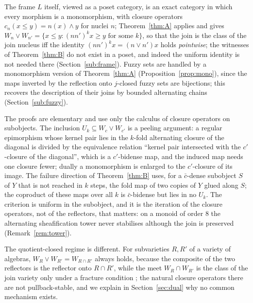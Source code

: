 \documentclass[11pt]{amsart}
\theoremstyle{definition}
\begin{document}
The frame $L$ itself, viewed as a poset category, is an exact category in
which every morphism is a monomorphism, with closure operators
$c_n(x\le y)=n(x)\wedge y$ for nuclei $n$; Theorem~\ref{thm:A} applies and
gives $W_n\vee W_{n'}=\{x\le y:(nn')^kx\ge y\text{ for some }k\}$, so that the
join is the class of the join nucleus iff the identity $(nn')^kx=(n\vee n')x$
holds \emph{pointwise}; the witnesses of Theorem~\ref{thm:B} do not exist in
a poset, and indeed the uniform identity is not needed there
(Section~\ref{sub:frame}). Fuzzy sets are handled by a monomorphism version
of Theorem~\ref{thm:A} (Proposition~\ref{prop:mono}), since the maps
inverted by the reflection onto $j$-closed fuzzy sets are bijections; this
recovers the description of their joins by bounded alternating chains
\cite{Fuzzysame} (Section~\ref{sub:fuzzy}).

The proofs are elementary and use only the calculus of closure operators on
subobjects. The inclusion $U_k\subseteq W_c\vee W_{c'}$ is a peeling argument:
a regular epimorphism whose kernel pair lies in the $k$-fold alternating
closure of the diagonal is divided by the equivalence relation ``kernel pair
intersected with the $c'$-closure of the diagonal'', which is a
$c'$-bidense map, and the induced map needs one closure fewer; dually a
monomorphism is enlarged to the $c'$-closure of its image. The failure
direction of Theorem~\ref{thm:B} uses, for a $\bar c$-dense subobject $S$
of $Y$ that is not reached in $k$ steps, the fold map of two copies of $Y$
glued along $S$; the coproduct of these maps over all $k$ is $\bar c$-bidense
but lies in no $U_k$. The criterion is uniform in the subobject, and it is
the iteration of the closure operators, not of the reflectors, that
matters: on a monoid of order $8$ the alternating sheafification tower
never stabilises although the join is preserved
(Remark~\ref{rem:tower}).

The quotient-closed regime is different. For subvarieties $R,R'$ of a
variety of algebras, $W_R\vee W_{R'}=W_{R\cap R'}$ always holds, because the
composite of the two reflectors is the reflector onto $R\cap R'$, while the
meet $W_R\cap W_{R'}$ is the class of the join variety only under a fracture
condition \cite{Varieties}; the natural closure operators there are not
pullback-stable, and we explain in Section~\ref{sec:dual} why no common
mechanism exists.
\end{document}
